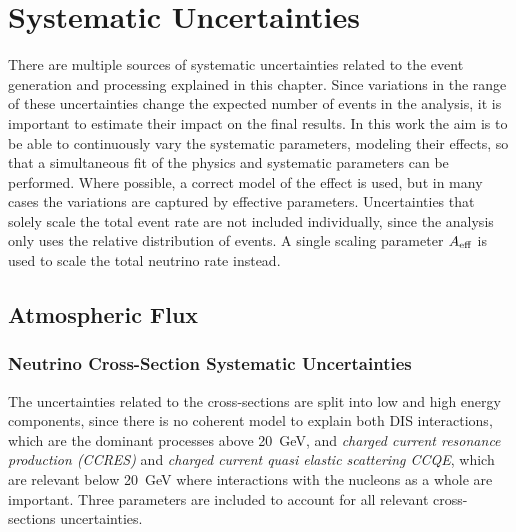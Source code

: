 


\section{Systematic Uncertainties} 


There are multiple sources of systematic uncertainties related to the event generation and processing explained in this chapter. Since variations in the range of these uncertainties change the expected number of events in the analysis, it is important to estimate their impact on the final results. In this work the aim is to be able to continuously vary the systematic parameters, modeling their effects, so that a simultaneous fit of the physics and systematic parameters can be performed. Where possible, a correct model of the effect is used, but in many cases the variations are captured by effective parameters. Uncertainties that solely scale the total event rate are not included individually, since the analysis only uses the relative distribution of events. A single scaling parameter $A_\rm{eff}$ is used to scale the total neutrino rate instead.


\subsection{Atmospheric Flux}



\subsubsection{Neutrino Cross-Section Systematic Uncertainties}

The uncertainties related to the cross-sections are split into low and high energy components, since there is no coherent model to explain both DIS interactions, which are the dominant processes above \SI{20}{\giga\electronvolt}, and \textit{charged current resonance production (CCRES)} and \textit{charged current quasi elastic scattering {CCQE}}, which are relevant below \SI{20}{\giga\electronvolt} where interactions with the nucleons as a whole are important. Three parameters are included to account for all relevant cross-sections uncertainties.

